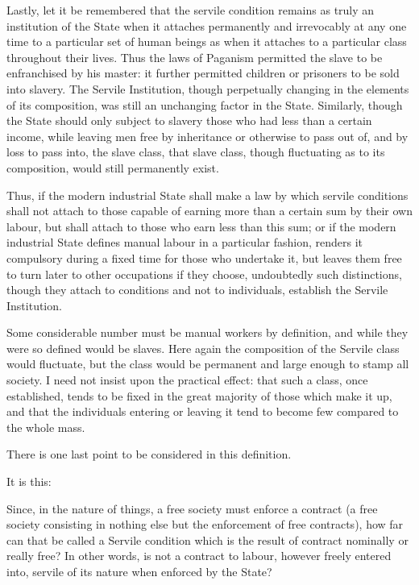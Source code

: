 \documentclass{book}
\begin{document}
Lastly, let it be remembered that the servile condition remains as truly an institution of the State when it attaches permanently and irrevocably at any one time to a particular set of human beings as when it attaches to a particular class throughout their lives. Thus the laws of Paganism permitted the slave to be enfranchised by his master: it further permitted children or prisoners to be sold into slavery. The Servile Institution, though perpetually changing in the elements of its composition, was still an unchanging factor in the State. Similarly, though the State should only subject to slavery those who had less than a certain income, while leaving men free by inheritance or otherwise to pass out of, and by loss to pass into, the slave class, that slave class, though fluctuating as to its composition, would still permanently exist.

Thus, if the modern industrial State shall make a law by which servile conditions shall not attach to those capable of earning more than a certain sum by their own labour, but shall attach to those who earn less than this sum; or if the modern industrial State defines manual labour in a particular fashion, renders it compulsory during a fixed time for those who undertake it, but leaves them free to turn later to other occupations if they choose, undoubtedly such distinctions, though they attach to conditions and not to individuals, establish the Servile Institution.

Some considerable number must be manual workers by definition, and while they were so defined would be slaves. Here again the composition of the Servile class would fluctuate, but the class would be permanent and large enough to stamp all society. I need not insist upon the practical effect: that such a class, once established, tends to be fixed in the great majority of those which make it up, and that the individuals entering or leaving it tend to become few compared to the whole mass.

There is one last point to be considered in this definition.

It is this:

Since, in the nature of things, a free society must enforce a contract (a free society consisting in nothing else but the enforcement of free contracts), how far can that be called a Servile condition which is the result of contract nominally or really free? In other words, is not a contract to labour, however freely entered into, servile of its nature when enforced by the State?
\end{document}
